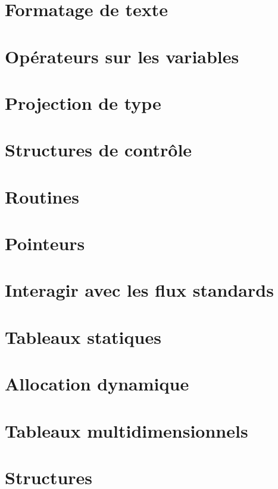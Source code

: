 \documentclass{minitelreport}
\begin{document}
\begin{refsection}
		\section{Formatage de texte}
		
		\section{Opérateurs sur les variables}
		
		\section{Projection de type}
		
		\section{Structures de contrôle}
		
		\section{Routines}
		
		\section{Pointeurs}
		
		\section{Interagir avec les flux standards}
		
		\section{Tableaux statiques}
		
		\section{Allocation dynamique}
		
		\section{Tableaux multidimensionnels}
		
		\section{Structures}
		

\end{refsection}
\end{document}
